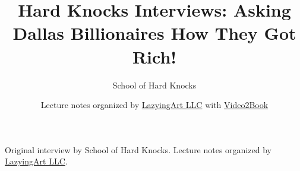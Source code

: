 \documentclass[11pt,oneside]{book}
\begin{document}
\frontmatter
\title{Hard Knocks Interviews: Asking Dallas Billionaires How They Got Rich!}
\author{School of Hard Knocks}
\date{Lecture notes organized by \href{https://lazying.art}{LazyingArt LLC} with \href{https://github.com/lachlanchen/Video2Book}{Video2Book}}
\maketitle
\begin{center}
\small Original interview by School of Hard Knocks. Lecture notes organized by \href{https://lazying.art}{LazyingArt LLC}.
\end{center}
\clearpage
\mainmatter

\end{document}
